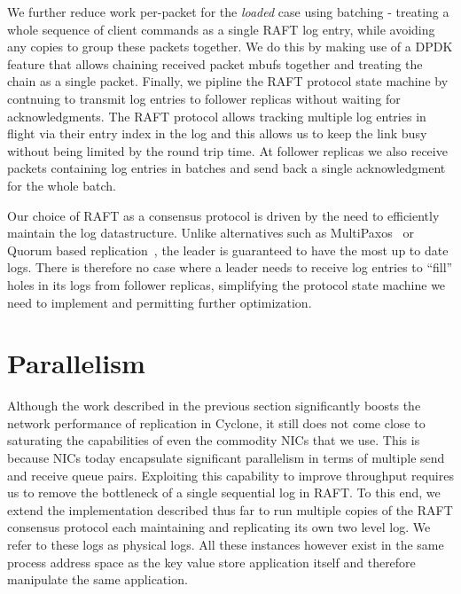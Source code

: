 \documentclass[letterpaper,twocolumn,10pt]{article}
\begin{document}
We further reduce work per-packet for the \emph{loaded} case using
batching - treating a whole sequence of client commands as a single
RAFT log entry, while avoiding any copies to group these packets
together. We do this by making use of a DPDK feature that allows
chaining received packet mbufs together and treating the chain as a
single packet.  Finally, we pipline the RAFT protocol state machine by
contnuing to transmit log entries to follower replicas without waiting
for acknowledgments. The RAFT protocol allows tracking multiple log
entries in flight via their entry index in the log and this allows us
to keep the link busy without being limited by the round trip time.
At follower replicas we also receive packets containing log entries in
batches and send back a single acknowledgment for the whole batch.

Our choice of RAFT as a consensus protocol is driven by the need to
efficiently maintain the log datastructure. Unlike alternatives such
as MultiPaxos~\cite{multipaxos} or Quorum based
replication~\cite{quorum}, the leader is guaranteed to have the most
up to date logs. There is therefore no case where a leader needs to
receive log entries to ``fill'' holes in its logs from follower
replicas, simplifying the protocol state machine we need to implement
and permitting further optimization.

\section{Parallelism}
\label{sec:parallelism}


Although the work described in the previous section significantly
boosts the network performance of replication in Cyclone, it still
does not come close to saturating the capabilities of even the
commodity NICs that we use. This is because NICs today encapsulate
significant parallelism in terms of multiple send and receive queue
pairs. Exploiting this capability to improve throughput requires us to
remove the bottleneck of a single sequential log in RAFT. To this end,
we extend the implementation described thus far to run multiple copies
of the RAFT consensus protocol each maintaining and replicating its
own two level log. We refer to these logs as physical logs. All these
instances however exist in the same process address space as the key
value store application itself and therefore manipulate the same
application.
\end{document}
